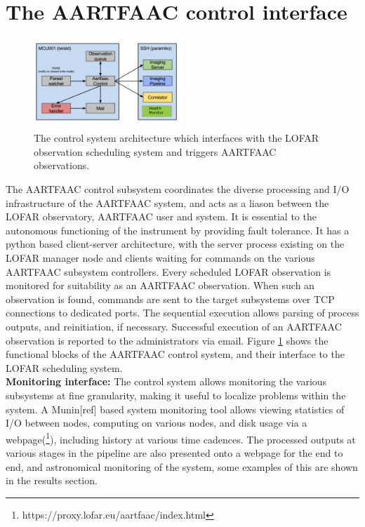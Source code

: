 \documentclass{ws-jai}
\begin{document}
\section {\label{sec:acontrol} The AARTFAAC control interface}
\begin{figure}[htbp]
\centering
\includegraphics[width=0.5\textwidth]{Figs/control_sys.png}
\caption{The  control  system  architecture  which  interfaces  with  the  LOFAR
  observation scheduling system and triggers AARTFAAC observations.}
\label{fig:afaac_ctrl_sys}
\end{figure}
The  AARTFAAC  control subsystem  coordinates  the  diverse processing  and  I/O
infrastructure of  the AARTFAAC system, and  acts as a liason  between the LOFAR
observatory,  AARTFAAC user  and  system.   It is  essential  to the  autonomous
functioning of  the instrument by  providing fault  tolerance.  It has  a python
based client-server architecture, with the  server process existing on the LOFAR
manager node and clients waiting for  commands on the various AARTFAAC subsystem
controllers. Every scheduled  LOFAR observation is monitored  for suitability as
an AARTFAAC observation. When such an observation is found, commands are sent to
the target subsystems  over TCP connections to dedicated  ports.  The sequential
execution   allows   parsing   of   process  outputs,   and   reinitiation,   if
necessary. Successful  execution of an  AARTFAAC observation is reported  to the
administrators via email.  Figure  \ref{fig:afaac_ctrl_sys} shows the functional
blocks  of  the AARTFAAC  control  system,  and  their  interface to  the  LOFAR
scheduling system.\\  

\noindent \textbf {Monitoring interface:} The control system allows monitoring the various
subsystems at fine granularity, making it useful to localize problems within the
system. A Munin[ref]  based system monitoring tool allows  viewing statistics of
I/O  between  nodes,   computing  on  various  nodes,  and  disk   usage  via  a
webpage(\footnote{https://proxy.lofar.eu/aartfaac/index.html}), including  history at  various time
cadences.  The processed  outputs at  various stages  in the  pipeline are  also
presented onto a webpage for the end  to end, and astronomical monitoring of the
system, some examples of this are shown in the results section.
\end{document}
